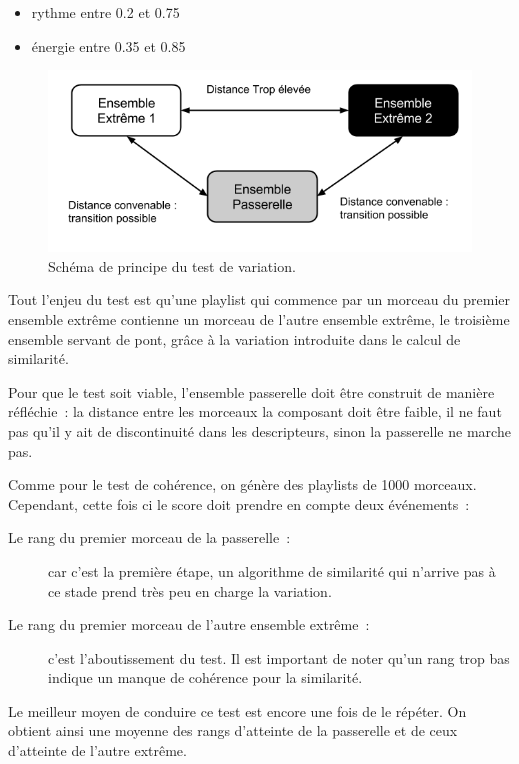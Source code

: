 \begin{itemize}
  \item rythme entre 0.2 et 0.75
  \item énergie entre 0.35 et 0.85
\end{itemize}

\begin{figure}[H]
\includegraphics[width=\textwidth]{data/tests/test-variation-passerelle.png}
\caption{Schéma de principe du test de variation.}
\end{figure}

Tout l'enjeu du test est qu'une playlist qui commence par un morceau du premier
ensemble extrême contienne un morceau de l'autre ensemble extrême, le troisième
ensemble servant de pont, grâce à la variation introduite dans le calcul de
similarité.

Pour que le test soit viable, l'ensemble passerelle doit être construit de
manière réfléchie~: la distance entre les morceaux la composant doit être 
faible, il ne faut pas qu'il y ait de discontinuité dans les descripteurs, 
sinon la passerelle ne marche pas.

Comme pour le test de cohérence, on génère des playlists de 1000 morceaux.
Cependant, cette fois ci le score doit prendre en compte deux événements~:
\begin{description}
  \item[Le rang du premier morceau de la passerelle~:] car c'est la première
  étape, un algorithme de similarité qui n'arrive pas à ce stade prend très peu
  en charge la variation.
  \item[Le rang du premier morceau de l'autre ensemble extrême~:] c'est
  l'aboutissement du test. Il est important de noter qu'un rang trop bas indique
  un manque de cohérence pour la similarité.
\end{description}

Le meilleur moyen de conduire ce test est encore une fois de le répéter. On
obtient ainsi une moyenne des rangs d'atteinte de la passerelle et de ceux
d'atteinte de l'autre extrême.

